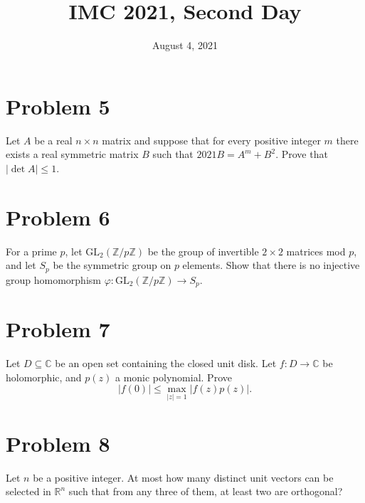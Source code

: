 \documentclass{article}
\title{IMC 2021, Second Day}
\date{August 4, 2021}
\begin{document}
\maketitle

\section*{Problem 5}
Let $A$ be a real $n \times n$ matrix and suppose that for every positive integer $m$ there exists a real symmetric matrix $B$ such that $2021 B = A^m + B^2$. Prove that $|\det A| \leq 1$.

\section*{Problem 6}
For a prime $p$, let $\mathrm{GL}_2(\mathbb{Z}/p\mathbb{Z})$ be the group of invertible $2 \times 2$ matrices mod $p$, and let $S_p$ be the symmetric group on $p$ elements. Show that there is no injective group homomorphism $\varphi: \mathrm{GL}_2(\mathbb{Z}/p\mathbb{Z}) \to S_p$.

\section*{Problem 7}
Let $D \subseteq \mathbb{C}$ be an open set containing the closed unit disk. Let $f: D \to \mathbb{C}$ be holomorphic, and $p(z)$ a monic polynomial. Prove
\[ |f(0)| \leq \max_{|z| = 1} |f(z) p(z)|. \]

\section*{Problem 8}
Let $n$ be a positive integer. At most how many distinct unit vectors can be selected in $\mathbb{R}^n$ such that from any three of them, at least two are orthogonal?
\end{document}
